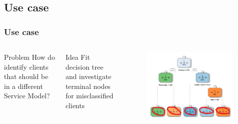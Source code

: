 \documentclass{beamer}\usepackage[]{graphicx}\usepackage[]{color}
\begin{document}
\subsection{Use case}
\begin{frame}[fragile]
\frametitle{Use case}
\begin{columns}[c] %
\begin{block}{Problem}
How do identify clients that should be in a different Service Model?
\end{block}
\begin{block}{Idea}
Fit decision tree and investigate terminal nodes for misclassified clients
\end{block}
\begin{figure}
	\includegraphics[width=\linewidth]{tree_plot.jpg}
\end{figure}
\end{columns}
\end{frame}
\end{document}
